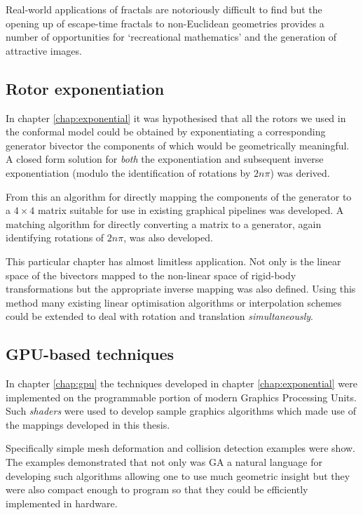 Real-world applications of fractals are notoriously difficult to find but the
opening up of escape-time fractals to non-Euclidean geometries provides a
number of opportunities for `recreational mathematics' and the generation of
attractive images.

\subsection{Rotor exponentiation}

In chapter \ref{chap:exponential} it was hypothesised that all the rotors we
used in the conformal model could be obtained by exponentiating a corresponding
generator bivector the components of which would be geometrically meaningful.
A closed form solution for \emph{both} the exponentiation and subsequent
inverse exponentiation (modulo the identification of rotations by $2n\pi$) was
derived.

From this an algorithm for directly mapping the components of the generator
to a $4 \times 4$ matrix suitable for use in existing graphical pipelines
was developed. A matching algorithm for directly converting a matrix to
a generator, again identifying rotations of $2n\pi$, was also developed.

This particular chapter has almost limitless application. Not only is the
linear space of the bivectors mapped to the non-linear space of rigid-body
transformations but the appropriate inverse mapping was also defined. Using
this method many existing linear optimisation algorithms or interpolation
schemes could be extended to deal with rotation and translation
\emph{simultaneously}.

\subsection{GPU-based techniques}

In chapter \ref{chap:gpu} the techniques developed in chapter \ref{chap:exponential}
were implemented on the programmable portion of modern Graphics Processing
Units. Such \emph{shaders} were used to develop sample graphics algorithms which
made use of the mappings developed in this thesis. 

Specifically simple mesh deformation and collision detection examples were show.
The examples demonstrated that not only was GA a natural language for developing
such algorithms allowing one to use much geometric insight but they were also
compact enough to program so that they could be efficiently implemented in hardware.

